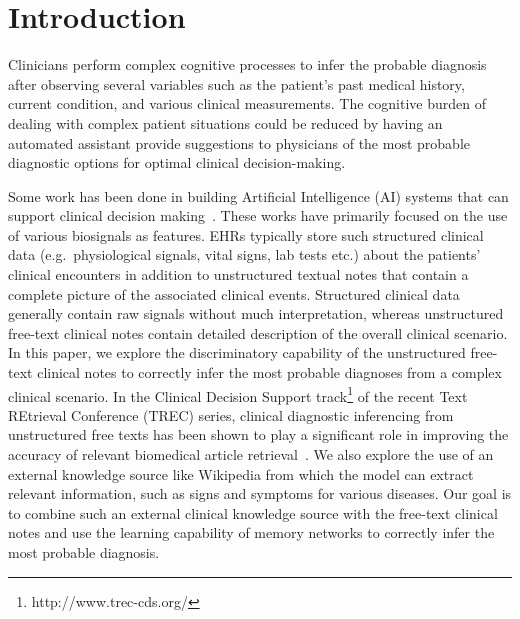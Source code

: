 \section{Introduction}
     Clinicians perform complex cognitive processes to infer the probable diagnosis after observing several variables such as the patient's past medical history, current condition, and various clinical measurements. The cognitive burden of dealing with complex patient situations could be reduced by having an automated assistant provide suggestions to physicians of the most probable diagnostic options for optimal clinical decision-making. 
    
    
    Some work has been done in building Artificial Intelligence (AI) systems that can support clinical decision making~\cite{DBLP:journals/corr/LiptonKEW15,choi2015doctor,Choi2016RETAINIP}. These works have primarily focused on the use of various biosignals as features. EHRs typically store such structured clinical data (e.g.\ physiological signals, vital signs, lab tests etc.) about the patients' clinical encounters in addition to unstructured textual notes that contain a complete picture of the associated clinical events. Structured clinical data generally contain raw signals without much interpretation, whereas unstructured free-text clinical notes contain detailed description of the overall clinical scenario. In this paper, we explore the discriminatory capability of the unstructured free-text clinical notes to correctly infer the most probable diagnoses from a complex clinical scenario. In the Clinical Decision Support track\footnote{http://www.trec-cds.org/} of the recent Text REtrieval Conference (TREC) series, clinical diagnostic inferencing from unstructured free texts has been shown to play a significant role in improving the accuracy of relevant biomedical article retrieval~\cite{sadid14,sadid15,sadid16}. We also explore the use of an external knowledge source like Wikipedia from which the model can extract relevant information, such as signs and symptoms for various diseases. Our goal is to combine such an external clinical knowledge source with the free-text clinical notes and use the learning capability of memory networks to correctly infer the most probable diagnosis.
    
